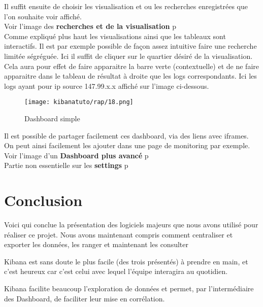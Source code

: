 Il suffit ensuite de choisir les visualisation et ou les recherches enregistrées 
que l'on souhaite voir affiché.\\[2mm]

    Voir l'image des \textbf{recherches et de la visualisation} p\pageref{fig:kibanatuto10}\\[2mm]
Comme expliqué plus haut les visualisations ainsi que les tableaux sont interactifs.
Il est par exemple possible de façon assez intuitive faire une recherche limitée ségréguée.
Ici il suffit de cliquer sur le quartier désiré de la visualisation. Cela aura pour 
effet de faire apparaitre la barre verte (contextuelle) et de ne faire apparaitre 
dans le tableau de résultat à droite que les logs correspondants. Ici les logs ayant
pour ip source 147.99.x.x affiché sur l'image ci-dessous.

\begin{figure}[H]
\center
\texttt{[image: kibanatuto/rap/18.png]}
\label{fig:kibanatuto11}
\caption{Dashboard simple}
\end{figure}

Il est possible de partager facilement ces dashboard, via des liens avec 
iframes. On peut ainsi facilement les ajouter dans une page de monitoring par exemple.\\[2mm]
Voir l'image d'un \textbf{Dashboard plus avancé} p\pageref{fig:kibanatuto12}\\[2mm]
Partie non essentielle sur les \textbf{settings} p\pageref{subsec:settings}

\section{Conclusion}
Voici qui conclue la présentation des logiciels majeurs que nous avons
utilisé pour réaliser ce projet. Nous avons maintenant compris comment
centraliser et exporter les données, les ranger et maintenant les consulter

Kibana est sans doute le plus facile (des trois présentés) à prendre en main, et c'est heureux 
car c'est celui avec lequel l'équipe interagira au quotidien.

Kibana facilite beaucoup l'exploration de données et permet, par l'intermédiaire des Dashboard,  de faciliter leur mise en corrélation.
